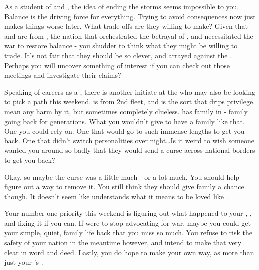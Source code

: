 \documentclass[char]{GL2020}
\begin{document}
As a student of \cEbb{} and \cFlow{}, the idea of ending the storms seems impossible to you. Balance is the driving force for everything. Trying to avoid consequences now just makes things worse later. What trade-offs are they willing to make? Given that \cHeadScientist{} and \cAssistantScientist{} are from \pTech{}, the nation that orchestrated the betrayal of \pShip{}, and necessitated the war to restore balance - you shudder to think what they might be willing to trade. It’s not fair that they should be so clever, and arrayed against the \pShip{}. Perhaps you will uncover something of interest if you can check out those meetings and investigate their claims?

Speaking of careers as a \cWarlordDaughter{\cleric}, there is another initiate at the \pSchool{} who may also be looking to pick a path this weekend. \cInitiate{} is from 2nd fleet, and is the sort that drips privilege. \cInitiate{\They}  mean any harm by it, but sometimes \cInitiate{\they} \cInitiate{\are} completely clueless. \cInitiate{} has family in \pFarm{} - family going back for generations. What you wouldn’t give to have a family like that. One you could rely on. One that would go to such immense lengths to get you back. One that didn’t switch personalities over night\ldots Is it weird to wish someone wanted you around so badly that they would send a curse across national borders to get you back?

Okay, so maybe the curse was a little much - or a lot much. You should help \cInitiate{} figure out a way to remove it. You still think they should give \cInitiate{\their} family a chance though. It doesn’t seem like \cInitiate{} understands what it means to be loved like \cInitiate{\they} \cInitiate{\are}. 

Your number one priority this weekend is figuring out what happened to your \cLoud{\parent}, \cLoud{}, and fixing it if you can. If \cLoud{\they} were to stop advocating for war, maybe you could get your simple, quiet, family life back that you miss so much. You refuse to risk the safety of your nation in the meantime however, and intend to make that very clear in word and deed. Lastly, you do hope to make your own way, as more than just your \cLoud{\parent}’s \cWarlordDaughter{\child}.
\end{document}
